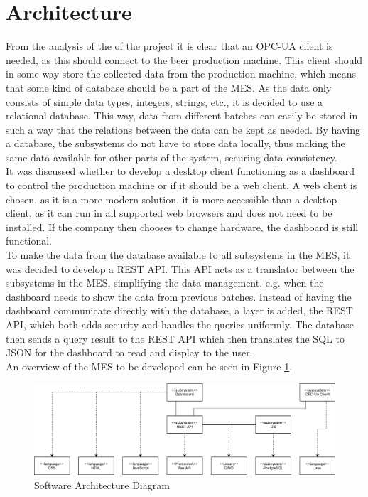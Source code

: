 \section{Architecture}
From the analysis of the of the project it is clear that an OPC-UA
client is needed, as this should connect to the beer production machine. This
client should in some way store the collected data from the production machine,
which means that some kind of database should be a part of the MES. As the data
only consists of simple data types, integers, strings, etc., it is decided
to use a relational database. This way, data from different batches can easily
be stored in such a way that the relations between the data can be kept as
needed. By having a database, the subsystems do not have to store data
locally, thus making the same data available for other parts of the system,
securing data consistency. \\

It was discussed whether to develop a desktop client functioning as a dashboard
to control the production machine or if it should be a web client. A web client 
is chosen, as it is a more modern solution, it is more accessible than a desktop
client, as it can run in all supported web browsers and does not need to be
installed. If the company then chooses to change hardware, the dashboard is
still functional. \\
 
To make the data from the database available to all subsystems in the MES, 
it was decided to develop a REST API. This API acts as a translator between the
subsystems in the MES, simplifying the data management, e.g. when the
dashboard needs to show the data from previous batches. Instead of having the
dashboard communicate directly with the database, a layer is added, the REST
API, which both adds security and handles the queries uniformly. The database
then sends a query result to the REST API which then translates the SQL to JSON
for the dashboard to read and display to the user. \\

An overview of the MES to be developed can be seen in Figure
\ref{figure:architucture_diagram}.

\begin{figure}[ht]
	\centering 
	\includegraphics[width=1\textwidth]{images/diagrams/architecture_diagram.png}
	\caption{Software Architecture Diagram}
	\label{figure:architucture_diagram} 
\end{figure}
